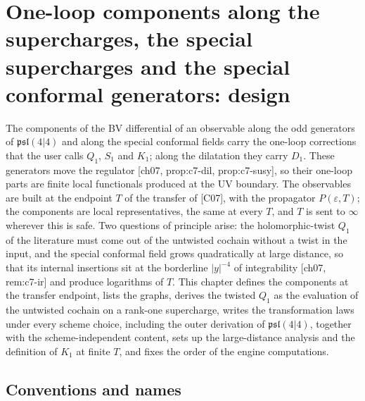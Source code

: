 \chapter{One-loop components along the supercharges, the special supercharges and the special conformal generators: design}

The components of the BV differential of an observable along the odd generators of $\mathfrak{psl}(4|4)$ and along the special conformal fields carry the one-loop corrections that the user calls $Q_1$, $S_1$ and $K_1$; along the dilatation they carry $D_1$. These generators move the regulator [ch07, prop:c7-dil, prop:c7-susy], so their one-loop parts are finite local functionals produced at the UV boundary. The observables are built at the endpoint $T$ of the transfer of [C07], with the propagator $P(\varepsilon,T)$; the components are local representatives, the same at every $T$, and $T$ is sent to $\infty$ wherever this is safe. Two questions of principle arise: the holomorphic-twist $Q_1$ of the literature must come out of the untwisted cochain without a twist in the input, and the special conformal field grows quadratically at large distance, so that its internal insertions sit at the borderline $|y|^{-4}$ of integrability [ch07, rem:c7-ir] and produce logarithms of $T$. This chapter defines the components at the transfer endpoint, lists the graphs, derives the twisted $Q_1$ as the evaluation of the untwisted cochain on a rank-one supercharge, writes the transformation laws under every scheme choice, including the outer derivation of $\mathfrak{psl}(4|4)$, together with the scheme-independent content, sets up the large-distance analysis and the definition of $K_1$ at finite $T$, and fixes the order of the engine computations.

\section{Conventions and names}

